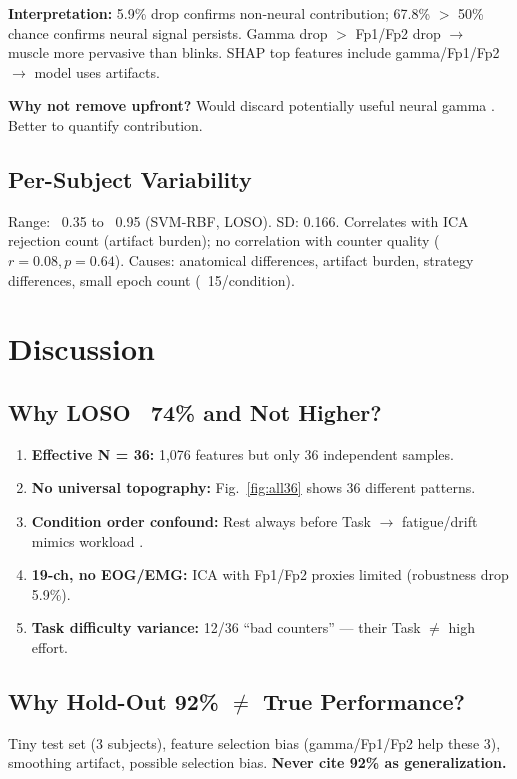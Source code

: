 \documentclass[conference]{IEEEtran}
\begin{document}
\textbf{Interpretation:} 5.9\% drop confirms non-neural contribution; 67.8\% $>$ 50\% chance confirms neural signal persists. Gamma drop $>$ Fp1/Fp2 drop $\rightarrow$ muscle more pervasive than blinks. SHAP top features include gamma/Fp1/Fp2 $\rightarrow$ model uses artifacts.

\textbf{Why not remove upfront?} Would discard potentially useful neural gamma \cite{ishii2014frontal}. Better to quantify contribution.

\subsection{Per-Subject Variability}
Range: ~0.35 to ~0.95 (SVM-RBF, LOSO). SD: 0.166. Correlates with ICA rejection count (artifact burden); no correlation with counter quality ($r=0.08, p=0.64$). Causes: anatomical differences, artifact burden, strategy differences, small epoch count (~15/condition).

\section{Discussion}

\subsection{Why LOSO ~74\% and Not Higher?}
\begin{enumerate}
    \item \textbf{Effective N = 36:} 1,076 features but only 36 independent samples.
    \item \textbf{No universal topography:} Fig.~\ref{fig:all36} shows 36 different patterns.
    \item \textbf{Condition order confound:} Rest always before Task $\rightarrow$ fatigue/drift mimics workload \cite{berka2007eeg}.
    \item \textbf{19-ch, no EOG/EMG:} ICA with Fp1/Fp2 proxies limited (robustness drop 5.9\%).
    \item \textbf{Task difficulty variance:} 12/36 ``bad counters'' — their Task $\neq$ high effort.
\end{enumerate}

\subsection{Why Hold-Out 92\% $\neq$ True Performance?}
Tiny test set (3 subjects), feature selection bias (gamma/Fp1/Fp2 help these 3), smoothing artifact, possible selection bias. \textbf{Never cite 92\% as generalization.}
\end{document}
